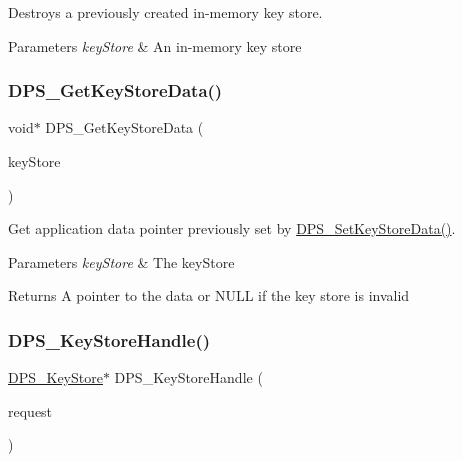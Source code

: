 Destroys a previously created in-\/memory key store. 


\begin{DoxyParams}{Parameters}
{\em key\+Store} & An in-\/memory key store \\
\hline
\end{DoxyParams}
\mbox{\label{group__keystore_ga3b67d7dde74267ee9342dc3efd33812b}} 
\subsubsection{\texorpdfstring{D\+P\+S\+\_\+\+Get\+Key\+Store\+Data()}{DPS\_GetKeyStoreData()}}
{\footnotesize\ttfamily void$\ast$ D\+P\+S\+\_\+\+Get\+Key\+Store\+Data (\begin{DoxyParamCaption}\item[{const \hyperlink{group__keystore_gaf3833cfe48f848f698514bc5daa075fa}{D\+P\+S\+\_\+\+Key\+Store} $\ast$}]{key\+Store }\end{DoxyParamCaption})}



Get application data pointer previously set by \hyperlink{group__keystore_gaf8062875af6cab5caabc3f13bf995807}{D\+P\+S\+\_\+\+Set\+Key\+Store\+Data()}. 


\begin{DoxyParams}{Parameters}
{\em key\+Store} & The key\+Store\\
\hline
\end{DoxyParams}
\begin{DoxyReturn}{Returns}
A pointer to the data or N\+U\+LL if the key store is invalid 
\end{DoxyReturn}
\mbox{\label{group__keystore_ga088b3dc5eff10ab334d1e2aa0a329c26}} 
\subsubsection{\texorpdfstring{D\+P\+S\+\_\+\+Key\+Store\+Handle()}{DPS\_KeyStoreHandle()}}
{\footnotesize\ttfamily \hyperlink{group__keystore_gaf3833cfe48f848f698514bc5daa075fa}{D\+P\+S\+\_\+\+Key\+Store}$\ast$ D\+P\+S\+\_\+\+Key\+Store\+Handle (\begin{DoxyParamCaption}\item[{\hyperlink{group__keystore_ga7c3e50965b65334e9791780fa855ed16}{D\+P\+S\+\_\+\+Key\+Store\+Request} $\ast$}]{request }\end{DoxyParamCaption})}



